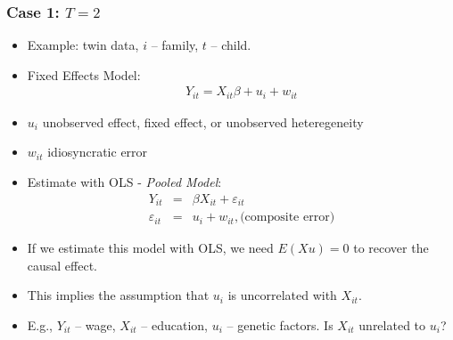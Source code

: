 \documentclass[notes=show,beamer,compress]{beamer}
\begin{document}
\begin{frame}
\frametitle{Case 1: $T=2$}
\begin{itemize}
\item Example: twin data, $i$ -- family, $t$ -- child.
\item Fixed Effects Model:
\[\begin{array}{cc}
  Y_{it}=  X_{it} \beta + u_i + w_{it}
\end{array}
\]
\item $u_i$ unobserved effect, fixed effect, or unobserved heteregeneity
\item $w_{it}$ idiosyncratic error

\item Estimate with OLS - \emph{Pooled Model}:
\begin{eqnarray*}
  Y_{it}&=& \beta X_{it}  + \varepsilon_{it}\\
  \varepsilon_{it} &=&  u_i + w_{it},  \text{(composite error)}
\end{eqnarray*}
\item If we estimate this model with OLS, we need $E\left(Xu\right)=0$ to recover the causal effect.
\item This implies the assumption that  $u_i$ is uncorrelated with $X_{it}$.
\item{E.g., $Y_{it}$ -- wage, $X_{it}$ -- education, $u_i$ -- genetic factors. Is $X_{it}$ unrelated to $u_i$?}
\end{itemize}
\end{frame}


\end{document}
